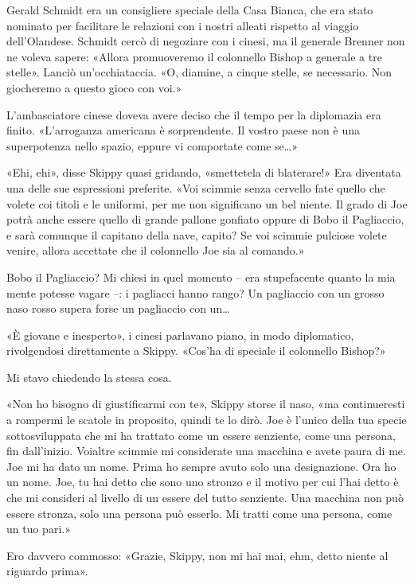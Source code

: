 Gerald Schmidt era un consigliere speciale della Casa Bianca, che era
stato nominato per facilitare le relazioni con i nostri alleati rispetto
al viaggio dell'Olandese. Schmidt cercò di negoziare con i cinesi, ma il
generale Brenner non ne voleva sapere: «Allora promuoveremo il
colonnello Bishop a generale a tre stelle». Lanciò un'occhiataccia. «O,
diamine, a cinque stelle, se necessario. Non giocheremo a questo gioco
con voi.»

L'ambasciatore cinese doveva avere deciso che il tempo per la diplomazia
era finito. «L'arroganza americana è sorprendente. Il vostro paese non è
una superpotenza nello spazio, eppure vi comportate come se\ldots»

«Ehi, ehi», disse Skippy quasi gridando, «smettetela di blaterare!» Era
diventata una delle sue espressioni preferite. «Voi scimmie senza
cervello fate quello che volete coi titoli e le uniformi, per me non
significano un bel niente. Il grado di Joe potrà anche essere quello di
grande pallone gonfiato oppure di Bobo il Pagliaccio, e sarà comunque il
capitano della nave, capito? Se voi scimmie pulciose volete venire,
allora accettate che il colonnello Joe sia al comando.»

Bobo il Pagliaccio? Mi chiesi in quel momento -- era stupefacente quanto
la mia mente potesse vagare --: i pagliacci hanno rango? Un pagliaccio
con un grosso naso rosso supera forse un pagliaccio con un\ldots{}

«È giovane e inesperto», i cinesi parlavano piano, in modo diplomatico,
rivolgendosi direttamente a Skippy. «Cos'ha di speciale il colonnello
Bishop?»

Mi stavo chiedendo la stessa cosa.

«Non ho bisogno di giustificarmi con te», Skippy storse il naso, «ma
continueresti a rompermi le scatole in proposito, quindi te lo dirò. Joe
è l'unico della tua specie sottosviluppata che mi ha trattato come un
essere senziente, come una persona, fin dall'inizio. Voialtre scimmie mi
considerate una macchina e avete paura di me. Joe mi ha dato un nome.
Prima ho sempre avuto solo una designazione. Ora ho un nome. Joe, tu hai
detto che sono uno stronzo e il motivo per cui l'hai detto è che mi
consideri al livello di un essere del tutto senziente. Una macchina non
può essere stronza, solo una persona può esserlo. Mi tratti come una
persona, come un tuo pari.»

Ero davvero commosso: «Grazie, Skippy, non mi hai mai, ehm, detto niente
al riguardo prima».

